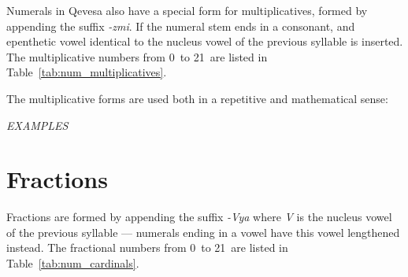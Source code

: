 \documentclass[grammar]{subfiles}
\begin{document}
	Numerals in Qevesa also have a special form for multiplicatives, formed by appending the suffix \emph{-zmi}. If the numeral stem ends in a consonant, and epenthetic vowel identical to the nucleus vowel of the previous syllable is inserted. The multiplicative numbers from 0\dec\ to 21\dec\ are listed in Table~\ref{tab:num_multiplicatives}.
	
	\begin{table}[htpb]\small\capstart
		\begin{center}
			\qquad
			\caption{Multiplicative numerals from 0\dec\ to 21\dec\label{tab:num_multiplicatives}}
		\end{center}
	\end{table}

	The multiplicative forms are used both in a repetitive and mathematical sense:

	\begin{exe}
		\ex \emph{EXAMPLES}
	\end{exe}

	\section{Fractions}
	\label{sec:num_fractions}

	Fractions are formed by appending the suffix \emph{-Vya} where \emph{V} is the nucleus vowel of the previous syllable — numerals ending in a vowel have this vowel lengthened instead. The fractional numbers from 0\dec\ to 21\dec\ are listed in Table~\ref{tab:num_cardinals}.
	
\end{document}
